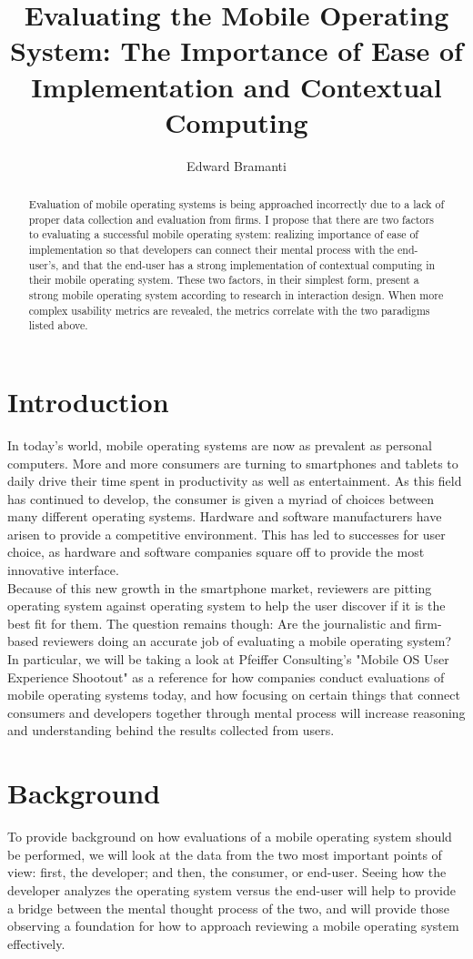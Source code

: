 \documentclass[11pt]{article}
\title{Evaluating the Mobile Operating System: The Importance of Ease of Implementation and Contextual Computing}
\author{Edward Bramanti}
\begin{document}
\maketitle
\begin{abstract}
Evaluation of mobile operating systems is being approached incorrectly due to a lack of proper data collection and evaluation from firms. I propose that there are two factors to evaluating a successful mobile operating system: realizing importance of ease of implementation so that developers can connect their mental process with the end-user's, and that the end-user has a strong implementation of contextual computing in their mobile operating system. These two factors, in their simplest form, present a strong mobile operating system according to research in interaction design. When more complex usability metrics are revealed, the metrics correlate with the two paradigms listed above.
\end{abstract}
\pagebreak
\section{Introduction}
In today's world, mobile operating systems are now as prevalent as personal computers. More and more consumers are turning to smartphones and tablets to daily drive their time spent in productivity as well as entertainment. As this field has continued to develop, the consumer is given a myriad of choices between many different operating systems. Hardware and software manufacturers have arisen to provide a competitive environment. This has led to successes for user choice, as hardware and software companies square off to provide the most innovative interface.\\
\indent Because of this new growth in the smartphone market, reviewers are pitting operating system against operating system to help the user discover if it is the best fit for them. The question remains though: Are the journalistic and firm-based reviewers doing an accurate job of evaluating a mobile operating system? In particular, we will be taking a look at Pfeiffer Consulting's "Mobile OS User Experience Shootout" as a reference for how companies conduct evaluations of mobile operating systems today, and how focusing on certain things that connect consumers and developers together through mental process will increase reasoning and understanding behind the results collected from users.

\section{Background}
\label{background}
To provide background on how evaluations of a mobile operating system should be performed, we will look at the data from the two most important points of view: first, the developer; and then, the consumer, or end-user. Seeing how the developer analyzes the operating system versus the end-user will help to provide a bridge between the mental thought process of the two, and will provide those observing a foundation for how to approach reviewing a mobile operating system effectively.
\end{document}
